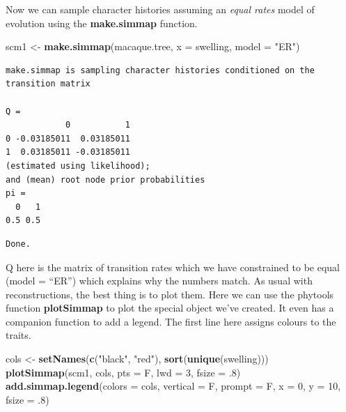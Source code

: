 \documentclass[
]{book}
\newenvironment{Shaded}{\begin{snugshade}}{\end{snugshade}}
\newcommand{\DataTypeTok}[1]{\textcolor[rgb]{0.13,0.29,0.53}{#1}}
\newcommand{\DecValTok}[1]{\textcolor[rgb]{0.00,0.00,0.81}{#1}}
\newcommand{\FloatTok}[1]{\textcolor[rgb]{0.00,0.00,0.81}{#1}}
\newcommand{\KeywordTok}[1]{\textcolor[rgb]{0.13,0.29,0.53}{\textbf{#1}}}
\newcommand{\NormalTok}[1]{#1}
\newcommand{\StringTok}[1]{\textcolor[rgb]{0.31,0.60,0.02}{#1}}
\begin{document}
Now we can sample character histories assuming an \emph{equal rates} model of evolution using the \textbf{make.simmap} function.

\begin{Shaded}
\begin{Highlighting}[]
\NormalTok{scm1 \textless{}{-}}\StringTok{ }\KeywordTok{make.simmap}\NormalTok{(macaque.tree, }\DataTypeTok{x =}\NormalTok{ swelling, }\DataTypeTok{model =} \StringTok{"ER"}\NormalTok{)}
\end{Highlighting}
\end{Shaded}

\begin{verbatim}
make.simmap is sampling character histories conditioned on the transition matrix

Q =
            0           1
0 -0.03185011  0.03185011
1  0.03185011 -0.03185011
(estimated using likelihood);
and (mean) root node prior probabilities
pi =
  0   1 
0.5 0.5 
\end{verbatim}

\begin{verbatim}
Done.
\end{verbatim}

Q here is the matrix of transition rates which we have constrained to be equal (model = ``ER'') which explains why the numbers match. As usual with reconstructions, the best thing is to plot them. Here we can use the phytools function \textbf{plotSimmap} to plot the special object we've created. It even has a companion function to add a legend. The first line here assigns colours to the traits.

\begin{Shaded}
\begin{Highlighting}[]
\NormalTok{cols \textless{}{-}}\StringTok{ }\KeywordTok{setNames}\NormalTok{(}\KeywordTok{c}\NormalTok{(}\StringTok{"black"}\NormalTok{, }\StringTok{"red"}\NormalTok{), }\KeywordTok{sort}\NormalTok{(}\KeywordTok{unique}\NormalTok{(swelling)))}
\KeywordTok{plotSimmap}\NormalTok{(scm1, cols, }\DataTypeTok{pts =}\NormalTok{ F, }\DataTypeTok{lwd =} \DecValTok{3}\NormalTok{, }\DataTypeTok{fsize =} \FloatTok{.8}\NormalTok{)}
\KeywordTok{add.simmap.legend}\NormalTok{(}\DataTypeTok{colors =}\NormalTok{ cols, }\DataTypeTok{vertical =}\NormalTok{ F, }\DataTypeTok{prompt =}\NormalTok{ F, }\DataTypeTok{x =} \DecValTok{0}\NormalTok{, }\DataTypeTok{y =} \DecValTok{10}\NormalTok{, }\DataTypeTok{fsize =} \FloatTok{.8}\NormalTok{)}
\end{Highlighting}
\end{Shaded}
\end{document}
